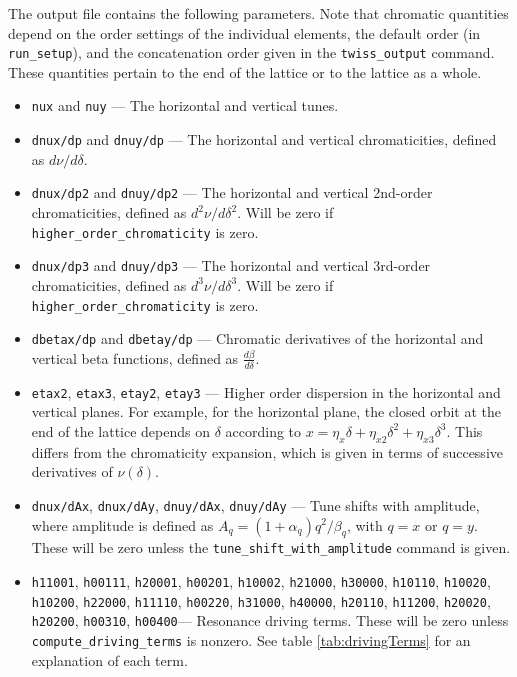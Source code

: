 \documentclass[11pt]{article}
\begin{document}
The output file contains the following parameters.  Note that chromatic quantities depend on the order 
settings of the individual elements, the default order (in \verb|run_setup|), and the concatenation order
given in the \verb|twiss_output| command.  These quantities pertain to the end of the lattice or to the
lattice as a whole.
\begin{itemize}
\item {\tt nux} and {\tt nuy} --- The horizontal and vertical tunes.
\item {\tt dnux/dp} and {\tt dnuy/dp} --- The horizontal and vertical chromaticities, defined as $d\nu/d\delta$.
\item {\tt dnux/dp2} and {\tt dnuy/dp2} --- The horizontal and vertical 2nd-order chromaticities, 
  defined as $d^2\nu/d\delta^2$.  Will be zero if \verb|higher_order_chromaticity| is zero.
\item {\tt dnux/dp3} and {\tt dnuy/dp3} --- The horizontal and vertical 3rd-order chromaticities, 
  defined as $d^3\nu/d\delta^3$.  Will be zero if \verb|higher_order_chromaticity| is zero.
\item {\tt dbetax/dp} and {\tt dbetay/dp} --- Chromatic derivatives of the horizontal and vertical beta functions,
defined as $\frac{d\beta}{d\delta}$.
\item {\tt etax2}, {\tt etax3}, {\tt etay2}, {\tt etay3} --- Higher order dispersion in the horizontal and
  vertical planes.  For example, for the horizontal plane, the closed orbit at the end of the lattice 
  depends on $\delta$ according to
  $x = \eta_x\delta + \eta_{x2} \delta^2 + \eta_{x3}\delta^3$.  This differs from the chromaticity expansion,
  which is given in terms of successive derivatives of $\nu(\delta)$.
\item {\tt dnux/dAx}, {\tt dnux/dAy}, {\tt dnuy/dAx}, {\tt dnuy/dAy} --- Tune shifts with amplitude, where amplitude
  is defined as $A_q = (1 + \alpha_q) q^2/\beta_q$, with $q=x$ or $q=y$.  These will
  be zero unless the \verb|tune_shift_with_amplitude| command is given.
\item {\tt h11001}, {\tt h00111}, {\tt h20001}, {\tt h00201}, {\tt h10002}, {\tt h21000}, {\tt h30000}, {\tt h10110}, {\tt h10020},
{\tt h10200}, {\tt h22000}, {\tt h11110}, {\tt h00220}, {\tt h31000}, {\tt h40000}, {\tt h20110}, {\tt h11200}, {\tt h20020},
{\tt h20200}, {\tt h00310}, {\tt h00400}--- Resonance driving terms\cite{Bengtsson}.  These will be
 zero unless \verb|compute_driving_terms| is nonzero.  See table \ref{tab:drivingTerms} for an explanation of each term.

\end{itemize}
\end{document}
